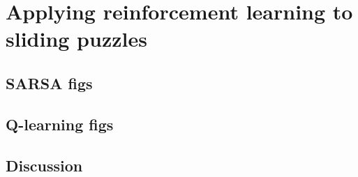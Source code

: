 \graphicspath{{Experiments\_and\_Results/fig}}

\chapter{Applying reinforcement learning to sliding puzzles}
\label{chap:Experiments_and_Results}

\section{SARSA figs}

\section{Q-learning figs}

\section{Discussion}

